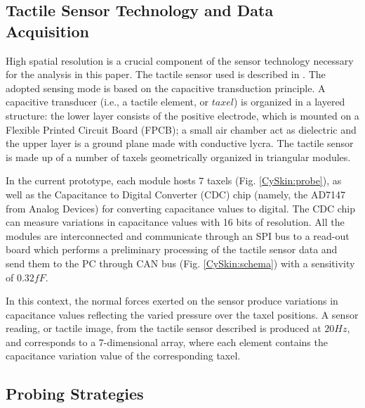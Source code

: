 \subsection{Tactile Sensor Technology and Data Acquisition} \label{sec_skin}
High spatial resolution is a crucial component of the sensor technology necessary for the 
analysis in this paper. The tactile sensor used is described in \cite{schmitz_methods_2011}. 
The adopted sensing mode is based on the capacitive transduction principle. 
A capacitive transducer (i.e., a tactile element, or $taxel$) is organized in a 
layered structure: the lower layer consists of the positive electrode, which is mounted 
on a Flexible Printed Circuit Board (FPCB); a small air chamber act as dielectric and the 
upper layer is a ground plane made with conductive lycra. The tactile sensor is made up 
of a number of taxels geometrically organized in triangular modules. 

In the current prototype, each module hosts $7$ taxels (Fig. \ref{CySkin:probe}), as well as 
the Capacitance to Digital Converter (CDC) chip (namely, the AD7147 from Analog Devices) for 
converting capacitance values to digital. The CDC chip can measure variations in capacitance 
values with 16 bits of resolution. All the modules are interconnected and communicate through 
an SPI bus to a read-out board which performs a preliminary processing of the tactile sensor 
data and send them to the PC through CAN bus (Fig. \ref{CySkin:schema}) %
with a sensitivity of $0.32fF$. 

In this context, the normal forces exerted on the sensor produce variations in capacitance 
values reflecting the varied pressure over the taxel positions. A sensor reading, or tactile 
image, from the tactile sensor described is produced at $20Hz$, and corresponds to 
a 7-dimensional array, where each element contains the capacitance variation value of 
the corresponding taxel.


\subsection{Probing Strategies} \label{sec_motor_interactions}

